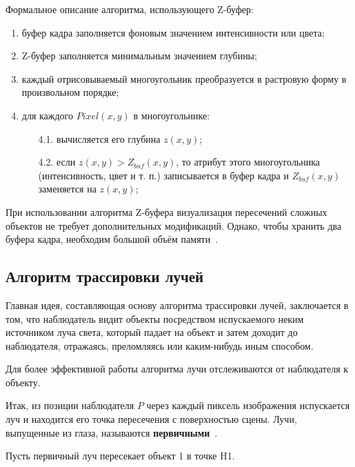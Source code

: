 Формальное описание алгоритма, использующего Z-буфер:
\begin{enumerate}
	\item буфер кадра заполняется фоновым значением интенсивности или цвета;
	\item Z-буфер заполняется минимальным значением глубины;
	\item каждый отрисовываемый многоугольник преобразуется в растровую форму в произвольном порядке;
	\item для каждого $Pixel(x, y)$ в многоугольнике:
	\begin{enumerate}
		\item[4.1.] вычисляется его глубина $z(x, y)$;
		\item[4.2.] если $z(x, y) > Z_{buf}(x, y)$, то атрибут этого многоугольника (интенсивность, цвет и т. п.) записывается в буфер кадра и $Z_{buf}(x, y)$ заменяется на $z(x, y)$;
	\end{enumerate}
\end{enumerate}  

При использовании алгоритма Z-буфера визуализация пересечений сложных объектов не требует дополнительных модификаций. Однако, чтобы хранить два буфера кадра, необходим большой объём памяти~\cite{rodjers, cg}.

\subsection{Алгоритм трассировки лучей}

Главная идея, составляющая основу алгоритма трассировки лучей, заключается в том, что наблюдатель видит объекты посредством испускаемого неким источником луча света, который падает на объект и затем доходит до наблюдателя, отражаясь, преломляясь или каким-нибудь иным способом.

Для более эффективной работы алгоритма лучи отслеживаются от наблюдателя к объекту.

Итак, из позиции наблюдателя $P$ через каждый пиксель изображения испускается луч и находится его точка пересечения с поверхностью сцены. Лучи, выпущенные из глаза, называются \textbf{первичными}~\cite{rt}.


\pagebreak

Пусть первичный луч пересекает объект 1 в точке H1.

